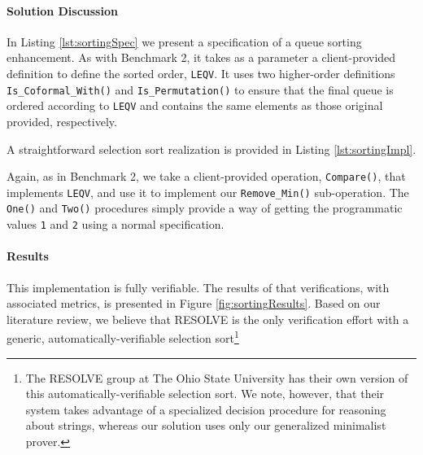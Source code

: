 \paragraph{Solution Discussion}In Listing \ref{lst:sortingSpec} we present a specification of a queue sorting enhancement.  As with Benchmark 2, it takes as a parameter a client-provided definition to define the sorted order, \texttt{LEQV}.  It uses two higher-order definitions \texttt{Is\_Coformal\_With()} and \texttt{Is\_Permutation()} to ensure that the final queue is ordered according to \texttt{LEQV} and contains the same elements as those original provided, respectively.



A straightforward selection sort realization is provided in Listing \ref{lst:sortingImpl}.



Again, as in Benchmark 2, we take a client-provided operation, \texttt{Compare()}, that implements \texttt{LEQV}, and use it to implement our \texttt{Remove\_Min()} sub-operation.  The \texttt{One()} and \texttt{Two()} procedures simply provide a way of getting the programmatic values \texttt{1} and \texttt{2} using a normal specification.

\paragraph{Results}This implementation is fully verifiable.  The results of that verifications, with associated metrics, is presented in Figure \ref{fig:sortingResults}.  Based on our literature review, we believe that RESOLVE is the only verification effort with a generic, automatically-verifiable selection sort\footnote{The RESOLVE group at The Ohio State University has their own version of this automatically-verifiable selection sort.  We note, however, that their system takes advantage of a specialized decision procedure for reasoning about strings, whereas our solution uses only our generalized minimalist prover.}

